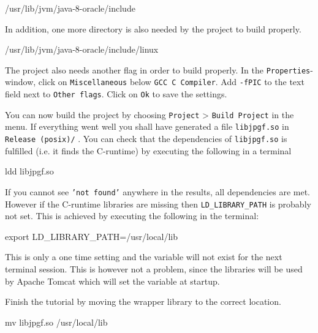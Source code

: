 \begin{terminal}
/usr/lib/jvm/java-8-oracle/include
\end{terminal}

In addition, one more directory is also needed by the project to build properly.

\begin{terminal}
/usr/lib/jvm/java-8-oracle/include/linux
\end{terminal}

The project also needs another flag in order to build properly. In the \texttt{Properties}-window, click on \texttt{Miscellaneous} below \texttt{GCC C Compiler}. Add \texttt{-fPIC} to the text field next to \texttt{Other flags}. Click on \texttt{Ok} to save the settings.

You can now build the project by choosing \texttt{Project} > \texttt{Build Project} in the menu. If everything went well you shall have generated a file \texttt{libjpgf.so} in \texttt{Release (posix)/} . You can check that the dependencies of \texttt{libjpgf.so} is fulfilled (i.e. it finds the C-runtime) by executing the following in a terminal

\begin{terminal}
ldd libjpgf.so
\end{terminal}

If you cannot see \texttt{'not found'} anywhere in the results, all dependencies are met. However if the C-runtime libraries are missing then \texttt{LD\_LIBRARY\_PATH} is probably not set. This is achieved by executing the following in the terminal:

\begin{terminal}
export LD_LIBRARY_PATH=/usr/local/lib
\end{terminal}

This is only a one time setting and the variable will not exist for the next terminal session. This is however not a problem, since the libraries will be used by Apache Tomcat which will set the variable at startup.

Finish the tutorial by moving the wrapper library to the correct location.

\begin{terminal}
mv libjpgf.so /usr/local/lib
\end{terminal}